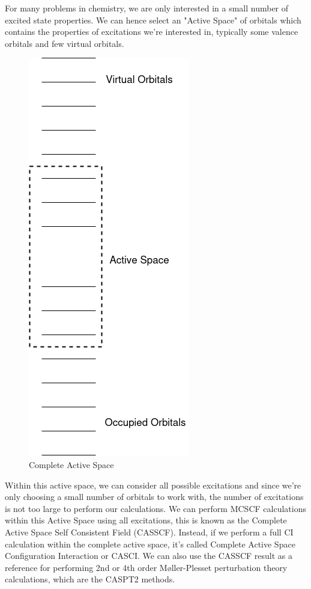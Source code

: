 For many problems in chemistry, we are only interested in a small number of excited state properties. We can hence select an "Active Space" of orbitals which contains the properties of excitations we're interested in, typically some valence orbitals and few virtual orbitals. 

\begin{figure}
    \centering
    \includegraphics[scale=0.5]{Figures/CAS.png}
    \caption{Complete Active Space}
    \label{fig:enter-label}
\end{figure}

Within this active space, we can consider all possible excitations and since we're only choosing a small number of orbitals to work with, the number of excitations is not too large to perform our calculations. We can perform MCSCF calculations within this Active Space using all excitations, this is known as the Complete Active Space Self Consistent Field (CASSCF). Instead, if we perform a full CI calculation within the complete active space, it's called Complete Active Space Configuration Interaction or CASCI. We can also use the CASSCF result as a reference for performing 2nd or 4th order  M{\o}ller-Plesset perturbation theory calculations, which are the CASPT2 methods. 

